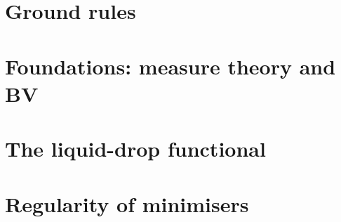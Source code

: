 \documentclass[11pt]{report}
\begin{document}

\part{Ground rules}



\part{Foundations: measure theory and BV}













\part{The liquid-drop functional}\label{part:functional}






\part{Regularity of minimisers}\label{part:regularity}











\end{document}
